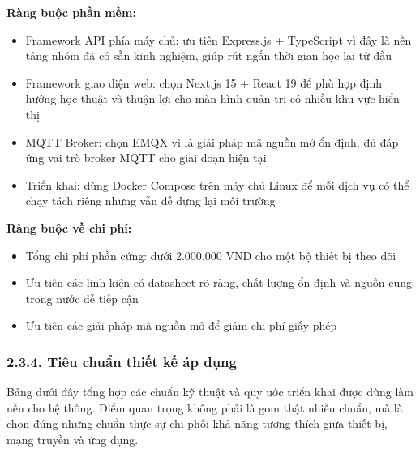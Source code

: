 \documentclass[a4paper]{extarticle}
\providecommand{\tightlist}{%
  \setlength{\itemsep}{0pt}\setlength{\parskip}{0pt}}
\begin{document}
\textbf{Ràng buộc phần mềm:}

\begin{itemize}
\tightlist
\item
  Framework API phía máy chủ: ưu tiên Express.js + TypeScript vì đây là nền tảng
  nhóm đã có sẵn kinh nghiệm, giúp rút ngắn thời gian học lại từ đầu
\item
  Framework giao diện web: chọn Next.js 15 + React 19 để phù hợp định hướng
  học thuật và thuận lợi cho màn hình quản trị có nhiều khu vực hiển thị
\item
  MQTT Broker: chọn EMQX vì là giải pháp mã nguồn mở ổn định, đủ đáp ứng
  vai trò broker MQTT cho giai đoạn hiện tại
\item
  Triển khai: dùng Docker Compose trên máy chủ Linux để mỗi dịch vụ có
  thể chạy tách riêng nhưng vẫn dễ dựng lại môi trường
\end{itemize}

\textbf{Ràng buộc về chi phí:}

\begin{itemize}
\tightlist
\item
  Tổng chi phí phần cứng: dưới 2.000.000 VND cho một bộ thiết bị theo dõi
\item
  Ưu tiên các linh kiện có datasheet rõ ràng, chất lượng ổn định và
  nguồn cung trong nước dễ tiếp cận
\item
  Ưu tiên các giải pháp mã nguồn mở để giảm chi phí giấy phép
\end{itemize}

\subsubsection{2.3.4. Tiêu chuẩn thiết kế áp
dụng}\label{234-tiuxeau-chuux1ea9n-thiux1ebft-kux1ebf-uxe1p-dux1ee5ng}

Bảng dưới đây tổng hợp các chuẩn kỹ thuật và quy ước triển khai được dùng
làm nền cho hệ thống. Điểm quan trọng không phải là gom thật nhiều chuẩn,
mà là chọn đúng những chuẩn thực sự chi phối khả năng tương thích giữa
thiết bị, mạng truyền và ứng dụng.
\end{document}
